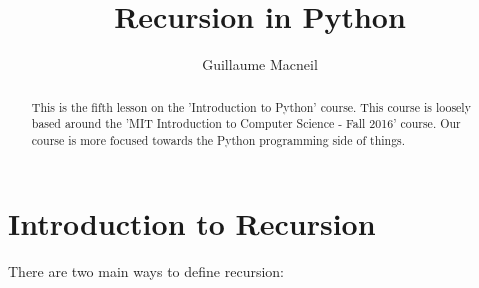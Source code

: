 \documentclass{article}
\title{Recursion in Python}
\author{Guillaume Macneil}
\begin{document}
\maketitle

\begin{abstract}
This is the fifth lesson on the 'Introduction to Python' course. This course is loosely based around the 'MIT Introduction to Computer Science - Fall 2016' course. Our course is more focused towards the Python programming side of things.
\end{abstract}

\section{Introduction to Recursion}
There are two main ways to define recursion:
\end{document}
